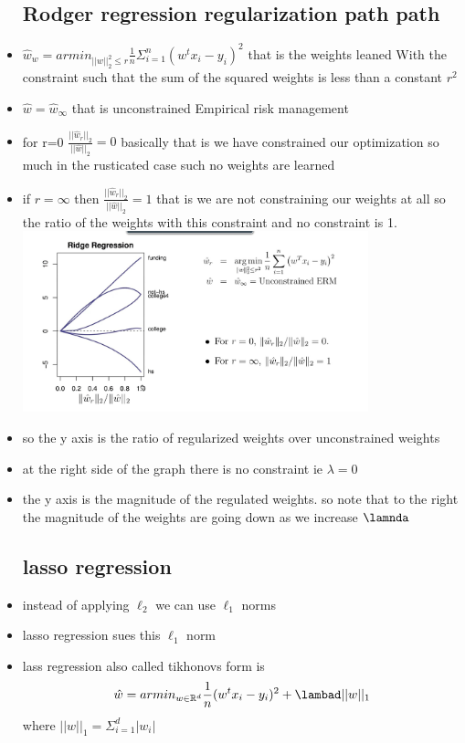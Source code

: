 \documentclass{article}
\begin{document}
\begin{itemize}
\subsection{Rodger regression regularization path path}
\item $\hat{w}_{w}=armin_{||w||^{2}_{2}\leq r}\frac{1}{n}\Sigma_{i=1}^{n}(w^{t}x_i-y_i)^2$ that is the weights leaned With the constraint such that the sum of the squared weights is less than a constant $r^2$
\item $\hat{w}=\hat{w}_{\infty}$ that is unconstrained Empirical risk management 
\item for r=0 $\frac{||\hat{w}_{r}||_{2}}{||\hat{w}||_{2}}=0$ basically that is we have constrained our optimization so much in the rusticated case such no weights are learned 
\item if $r=\infty$ then $\frac{||\hat{w}_{r}||_{2}}{||\hat{w}||_{2}}=1$ that is we are not constraining our weights at all so the ratio of the weights with this constraint and no constraint is 1. 
\includegraphics[width=10cm]{lecture_notes/lecture_3/immages/l3_3.jpg}
\item so the y axis is the ratio of regularized weights over unconstrained weights 
\item at the right side of the graph there is no constraint ie $\lambda=0$
\item the y axis is the magnitude of the regulated weights. so note that to the right the magnitude of the weights are going down as we increase $\lamnda$ 

\subsection{lasso regression}
\item instead of applying $\ell_2$  we can use $\ell_{1}$ norms 
\item lasso regression sues this $\ell_{1}$ norm 
\item lass regression also called tikhonovs form is $$\hat{w}=armin_{w\in \mathbb{R}^{d}}\frac{1}{n}(w^{t}x_{i}-y_{i})^2+\lambad ||w||_{1}$$
where $||w||_{1}=\Sigma_{i=1}^{d}|w_i|$


\end{itemize}
\end{document}
